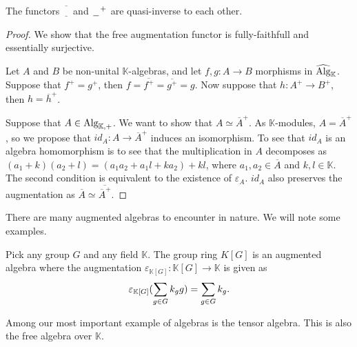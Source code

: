 \documentclass[../thesis.tex]{subfiles}
\begin{document}
            \begin{proposition}
                The functors $\overline{\underline{\phantom{A}}}$ and $\argument^+$ are quasi-inverse to each other.
            \end{proposition}

            \begin{proof}
                We show that the free augmentation functor is fully-faithfull and essentially surjective. 

                Let $A$ and $B$ be non-unital $\mathbb{K}$-algebras, and let $f,g : A \rightarrow B$ morphisms in $\widehat{\tt{Alg}}_\mathbb{K}$. Suppose that $f^+ = g^+$, then $f = \overline{f^+} = \overline{g^+} = g$. Now suppose that $h : A^+ \rightarrow B^+$, then $h = \overline{h}^+$.

                Suppose that $A\in \tt{Alg}_{\mathbb{K},+}$. We want to show that $A \simeq \overline{A}^+$. As $\mathbb{K}$-modules, $A = \overline{A}^+$, so we propose that $id_A : A \rightarrow \overline{A}^+$ induces an isomorphism. To see that $id_A$ is an algebra homomorphism is to see that the multiplication in $A$ decomposes as $(a_1 + k)(a_2 + l) = (a_1a_2 + a_1l + ka_2) + kl$, where $a_1,a_2\in \overline{A}$ and $k,l \in \mathbb{K}$. The second condition is equivalent to the existence of $\varepsilon_A$. $id_A$ also preserves the augmentation as $\overline{A} \simeq \overline{\overline{A}^+}$.
            \end{proof}

            There are many augmented algebras to encounter in nature. We will note some examples.

            \begin{example}
                Pick any group $G$ and any field $\mathbb{K}$. The group ring $K[G]$ is an augmented algebra where the augmentation $\varepsilon_{\mathbb{K}[G]} : \mathbb{K}[G] \rightarrow \mathbb{K}$ is given as
                \begin{align*}
                    \varepsilon_{\mathbb{K}[G]}(\sum_{g\in G}k_gg) = \sum_{g\in G}k_g\tt{.}
                \end{align*}
            \end{example}

            Among our most important example of algebras is the tensor algebra. This is also the free algebra over $\mathbb{K}$.
\end{document}
